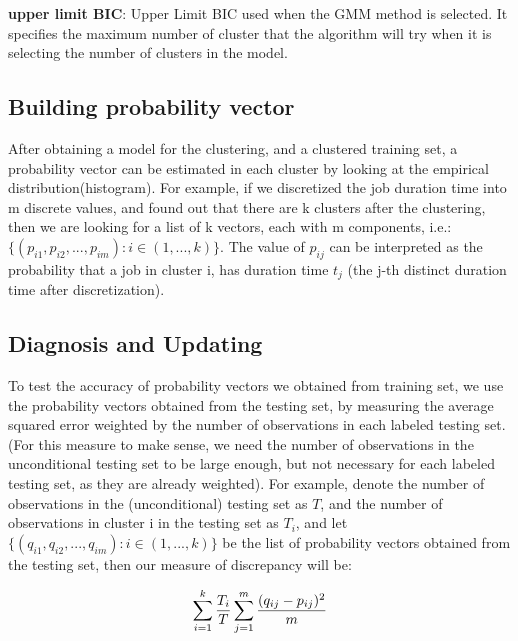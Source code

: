 \documentclass{article}
\begin{document}
\begin{flushleft}
\textbf{upper limit BIC}: Upper Limit BIC used when the GMM method is selected. It
specifies the maximum number of cluster that the algorithm will try when it is
selecting the number of clusters in the model.
\end{flushleft}

\subsection{Building probability vector}

\begin{flushleft}
After obtaining a model for the clustering, and a clustered training set, a
probability vector can be estimated in each cluster by looking at the empirical
distribution(histogram). For example, if we discretized the job duration time
into m discrete values, and found out that there are k clusters after the
clustering, then we are looking for a list of k vectors, each with m components,
i.e.: $\{(p_{i1}, p_{i2}, ..., p_{im}) : i \in (1,...,k)\}$. The value of
$p_{ij}$ can be interpreted as the probability that a job in cluster i, has
duration time $t_j$ (the j-th distinct duration time after discretization).
\end{flushleft}

\subsection{Diagnosis and Updating}

\begin{flushleft}
To test the accuracy of probability vectors we obtained from training set, we
use the probability vectors obtained from the testing set, by measuring the
average squared error weighted by the number of observations in each labeled
testing set. (For this measure to make sense, we need the number of observations
in the unconditional testing set to be large enough, but not necessary for each
labeled testing set, as they are already weighted). For example, denote the
number of observations in the (unconditional) testing set as $T$, and the number
of observations in cluster i in the testing set as $T_i$, and let $\{(q_{i1},
q_{i2}, ..., q_{im}) : i \in (1,...,k)\}$ be the list of probability vectors
obtained from the testing set, then our measure of discrepancy will be:
\end{flushleft}

\begin{flushleft}
\begin{equation}
\centering
        \sum_{i = 1} ^{k} \frac{T_i}{T} \sum_{j = 1}^{m} \frac{(q_{ij} - p_{ij})^2}{m}
\end{equation}
\end{flushleft}
\end{document}
